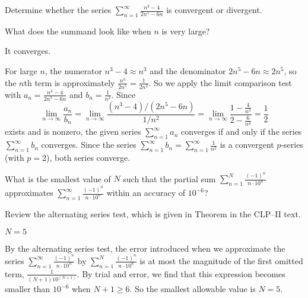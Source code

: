 \begin{question}[2016Q6]
Determine whether the series
$\displaystyle\sum_{n=1}^\infty\frac{n^3-4}{2n^5-6n}$
is convergent or divergent.
\end{question}

\begin{hint}
What does the summand look like when $n$ is very large?
\end{hint}

\begin{answer}
It converges.
\end{answer}

\begin{solution}
For large $n$, the numerator $n^3-4\approx n^3$ and the denominator
$2n^5-6n\approx 2n^5$, so the $n$th term is approximately
$\frac{n^3}{2n^5}=\frac{1}{2n^2}$. So we apply the limit comparison
test with $a_n=\frac{n^3-4}{2n^5-6n}$ and $b_n=\frac{1}{n^2}$. Since
\begin{equation*}
\lim_{n\rightarrow\infty}\frac{a_n}{b_n}
=\lim_{n\rightarrow\infty}\frac{(n^3-4)/(2n^5-6n)}{1/n^2}
=\lim_{n\rightarrow\infty}\frac{1-\frac{4}{n^3}}{2-\frac{6}{n^4}}
=\frac12
\end{equation*}
exists and is nonzero, the given series $\sum\limits_{n=1}^\infty a_n$ converges if and only
if the series $\sum\limits_{n=1}^\infty b_n$ converges.
Since the series $\sum\limits_{n=1}^\infty b_n
=\sum\limits_{n=1}^\infty\frac{1}{n^2}$
is a convergent $p$-series (with $p=2$), both series converge.
\end{solution}

\begin{question}[2016Q6]
What is the smallest value of $N$ such that the partial sum
$
\displaystyle\sum_{n=1}^N\frac{(-1)^n}{n\cdot 10^n}
$
approximates
$
\displaystyle\sum_{n=1}^\infty\frac{(-1)^n}{n\cdot 10^n}
$
within an accuracy of $10^{-6}$?
\end{question}

\begin{hint}
Review the alternating series test, which is given in
Theorem  in the
CLP--II text.
\end{hint}

\begin{answer}
$N=5$
\end{answer}

\begin{solution}
By the alternating series test, the error introduced when we approximate
the series
$\displaystyle
\sum_{n=1}^\infty\frac{(-1)^n}{n\cdot 10^n}
$
by
$\displaystyle
\sum_{n=1}^N\frac{(-1)^n}{n\cdot 10^n}
$
is at most the magnitude of the  first omitted term,
$\displaystyle\frac1{(N+1) 10^{(N+1)}}$. By trial and error, we find that this expression becomes
smaller than $10^{-6}$ when $N+1\ge 6$. So the smallest
allowable value is $N=5$.

\end{solution}



